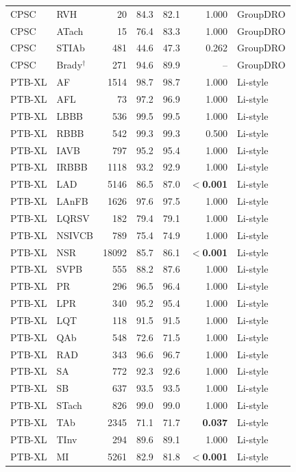 \begin{longtable}{@{}llrrrrl@{}}
CPSC & RVH & 20 & 84.3 & 82.1 & 1.000 & GroupDRO \\
CPSC & ATach & 15 & 76.4 & 83.3 & 1.000 & GroupDRO \\
CPSC & STIAb & 481 & 44.6 & 47.3 & 0.262 & GroupDRO \\
CPSC & Brady$^\dagger$ & 271 & 94.6 & 89.9 & -- & GroupDRO \\
\midrule
PTB-XL & AF & 1514 & 98.7 & 98.7 & 1.000 & Li-style \\
PTB-XL & AFL & 73 & 97.2 & 96.9 & 1.000 & Li-style \\
PTB-XL & LBBB & 536 & 99.5 & 99.5 & 1.000 & Li-style \\
PTB-XL & RBBB & 542 & 99.3 & 99.3 & 0.500 & Li-style \\
PTB-XL & IAVB & 797 & 95.2 & 95.4 & 1.000 & Li-style \\
PTB-XL & IRBBB & 1118 & 93.2 & 92.9 & 1.000 & Li-style \\
PTB-XL & LAD & 5146 & 86.5 & 87.0 & \textbf{$<$0.001} & Li-style \\
PTB-XL & LAnFB & 1626 & 97.6 & 97.5 & 1.000 & Li-style \\
PTB-XL & LQRSV & 182 & 79.4 & 79.1 & 1.000 & Li-style \\
PTB-XL & NSIVCB & 789 & 75.4 & 74.9 & 1.000 & Li-style \\
PTB-XL & NSR & 18092 & 85.7 & 86.1 & \textbf{$<$0.001} & Li-style \\
PTB-XL & SVPB & 555 & 88.2 & 87.6 & 1.000 & Li-style \\
PTB-XL & PR & 296 & 96.5 & 96.4 & 1.000 & Li-style \\
PTB-XL & LPR & 340 & 95.2 & 95.4 & 1.000 & Li-style \\
PTB-XL & LQT & 118 & 91.5 & 91.5 & 1.000 & Li-style \\
PTB-XL & QAb & 548 & 72.6 & 71.5 & 1.000 & Li-style \\
PTB-XL & RAD & 343 & 96.6 & 96.7 & 1.000 & Li-style \\
PTB-XL & SA & 772 & 92.3 & 92.6 & 1.000 & Li-style \\
PTB-XL & SB & 637 & 93.5 & 93.5 & 1.000 & Li-style \\
PTB-XL & STach & 826 & 99.0 & 99.0 & 1.000 & Li-style \\
PTB-XL & TAb & 2345 & 71.1 & 71.7 & \textbf{0.037} & Li-style \\
PTB-XL & TInv & 294 & 89.6 & 89.1 & 1.000 & Li-style \\
PTB-XL & MI & 5261 & 82.9 & 81.8 & \textbf{$<$0.001} & Li-style \\

\end{longtable}
